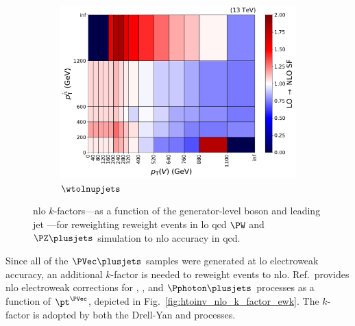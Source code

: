 \begin{figure}[htbp]
    \begin{subfigure}[b]{0.49\textwidth}
        \includegraphics[width=\textwidth]{figures/nlo_k_factors/2D_wjets.pdf}
        \caption{$\wtolnupjets$}
    \end{subfigure}
    \caption[NLO $k$-factors---as a function of the generator-level boson \pt and leading jet \pt---for reweighting events in LO QCD $\PW$ and $\PZ \plusjets$ simulation to NLO accuracy in QCD]{\acrshort{nlo} $k$-factors---as a function of the generator-level boson \pt and leading jet \pt---for reweighting reweight events in \acrshort{lo} \acrshort{qcd} $\PW$ and $\PZ \plusjets$ simulation to \acrshort{nlo} accuracy in \acrshort{qcd}.}
    \label{fig:htoinv_nlo_k_factors_qcd}
\end{figure}

Since all of the $\PVec \plusjets$ samples were generated at \acrshort{lo} electroweak accuracy, an additional $k$-factor is needed to reweight events to \acrshort{nlo}. Ref.~provides \acrshort{nlo} electroweak corrections for \PW, \PZ, and $\Pphoton\plusjets$ processes as a function of $\pt^{\PVec}$, depicted in Fig.~\ref{fig:htoinv_nlo_k_factor_ewk}. The \PZ $k$-factor is adopted by both the Drell-Yan and \ztonunu processes.

\clearpage

